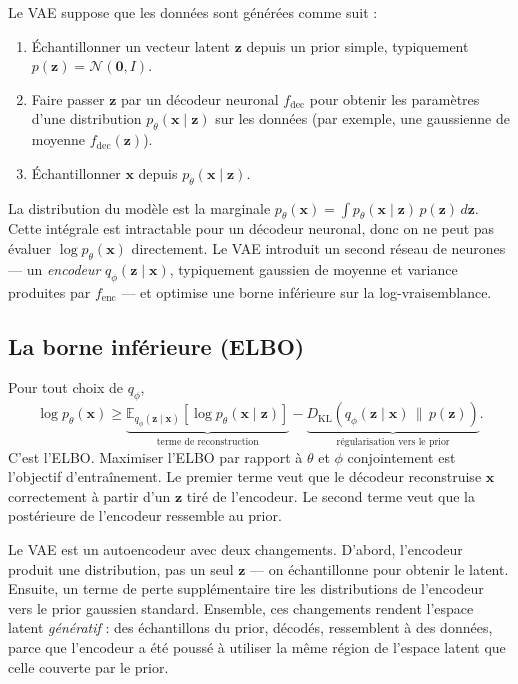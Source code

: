 Le VAE suppose que les données sont générées comme suit :
\begin{enumerate}
  \item Échantillonner un vecteur latent $\bm{z}$ depuis un prior simple, typiquement $p(\bm{z}) = \mathcal{N}(\bm{0}, I)$.
  \item Faire passer $\bm{z}$ par un décodeur neuronal $f_{\text{dec}}$ pour obtenir les paramètres d'une distribution $p_\theta(\bm{x} \mid \bm{z})$ sur les données (par exemple, une gaussienne de moyenne $f_{\text{dec}}(\bm{z})$).
  \item Échantillonner $\bm{x}$ depuis $p_\theta(\bm{x} \mid \bm{z})$.
\end{enumerate}
La distribution du modèle est la marginale $p_\theta(\bm{x}) = \int p_\theta(\bm{x} \mid \bm{z}) \, p(\bm{z}) \, d\bm{z}$. Cette intégrale est intractable pour un décodeur neuronal, donc on ne peut pas évaluer $\log p_\theta(\bm{x})$ directement. Le VAE introduit un second réseau de neurones --- un \emph{encodeur} $q_\phi(\bm{z} \mid \bm{x})$, typiquement gaussien de moyenne et variance produites par $f_{\text{enc}}$ --- et optimise une borne inférieure sur la log-vraisemblance.

\subsection{La borne inférieure (ELBO)}

Pour tout choix de $q_\phi$,
\[
\log p_\theta(\bm{x}) \geq \underbrace{\mathbb{E}_{q_\phi(\bm{z} \mid \bm{x})}\!\left[ \log p_\theta(\bm{x} \mid \bm{z}) \right]}_{\text{terme de reconstruction}} - \underbrace{D_{\mathrm{KL}}(q_\phi(\bm{z} \mid \bm{x}) \,\|\, p(\bm{z}))}_{\text{régularisation vers le prior}}.
\]
C'est l'ELBO. Maximiser l'ELBO par rapport à $\theta$ et $\phi$ conjointement est l'objectif d'entraînement. Le premier terme veut que le décodeur reconstruise $\bm{x}$ correctement à partir d'un $\bm{z}$ tiré de l'encodeur. Le second terme veut que la postérieure de l'encodeur ressemble au prior.

\begin{intuition}
Le VAE est un autoencodeur avec deux changements. D'abord, l'encodeur produit une distribution, pas un seul $\bm{z}$ --- on échantillonne pour obtenir le latent. Ensuite, un terme de perte supplémentaire tire les distributions de l'encodeur vers le prior gaussien standard. Ensemble, ces changements rendent l'espace latent \emph{génératif} : des échantillons du prior, décodés, ressemblent à des données, parce que l'encodeur a été poussé à utiliser la même région de l'espace latent que celle couverte par le prior.
\end{intuition}

